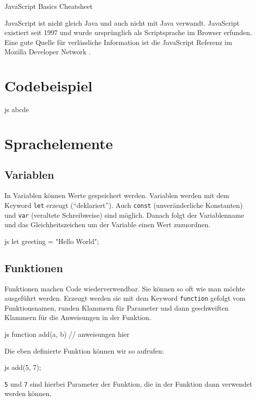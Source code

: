 \documentclass[10pt,a4paper]{article}
\begin{document}
{\color{accentcolor}JavaScript Basics Cheatsheet}

\begin{multicols}{3}

\scriptsize



JavaScript ist nicht gleich Java und auch nicht mit Java verwandt. JavaScript existiert seit 1997 und wurde ursprünglich als Scriptsprache im Browser erfunden. Eine gute Quelle für verlässliche Information ist die JavaScript Referenz im Mozilla Developer Network \cite{mdn-js}.

\section*{Codebeispiel}
\begin{codebox}{js}{}
  abcde
\end{codebox}


\section*{Sprachelemente}

\subsection*{Variablen}
In Variablen können Werte gespeichert werden. Variablen werden mit dem Keyword \texttt{let} erzeugt (\enquote{deklariert}). Auch \texttt{const} (unveränderliche Konstanten) und \texttt{var} (veraltete Schreibweise) sind möglich. Danach folgt der Variablenname und das Gleichheitszeichen um der Variable einen Wert zuzuordnen.
\begin{codebox}{js}{}
  let greeting = "Hello World";
\end{codebox}

\subsection*{Funktionen}
Funktionen machen Code wiederverwendbar. Sie können so oft wie man möchte ausgeführt werden. Erzeugt werden sie mit dem Keyword \texttt{function} gefolgt vom Funktionsnamen, runden Klammern für Parameter und dann geschweiften Klammern für die Anweisungen in der Funktion.
\begin{codebox}{js}{}
  function add(a, b) {
    // anweisungen hier
  }
\end{codebox}
Die eben definierte Funktion können wir so aufrufen:
\begin{codebox}{js}{}
  add(5, 7);
\end{codebox}
\texttt{5} und \texttt{7} sind hierbei Parameter der Funktion, die in der Funktion dann verwendet werden können.


\end{multicols}
\end{document}
